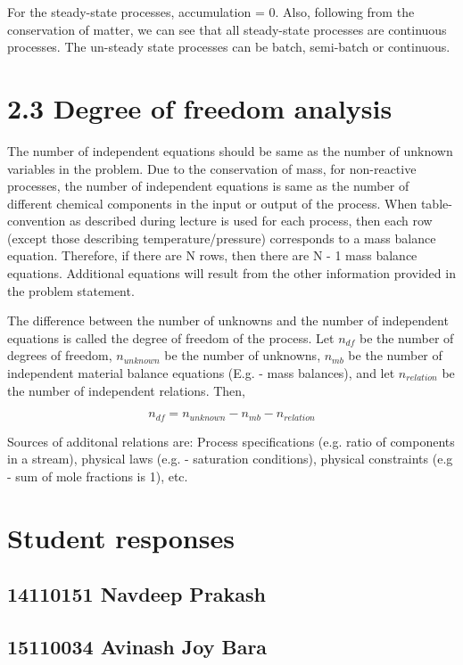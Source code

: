 \documentclass[journal=jpcbfk,manuscript=article]{achemso}
\begin{document}
For the steady-state processes, accumulation = 0. Also, following from the conservation of matter, we can see that all steady-state processes are continuous processes. The un-steady state processes can be batch, semi-batch or continuous.

\section{2.3 Degree of freedom analysis}

The number of independent equations should be same as the number of unknown variables in the problem. Due to the conservation of mass, for non-reactive processes, the number of independent equations is same as the number of different chemical components in the input or output of the process. When table-convention as described during lecture is used for each process, then each row (except those describing temperature/pressure) corresponds to a mass balance equation. Therefore, if there are N rows, then there are N - 1 mass balance equations. Additional equations will result from the other information provided in the problem statement.  

The difference between the number of unknowns and the number of independent equations is called the degree of freedom of the process. Let $n_{df}$ be the number of degrees of freedom, $n_{unknown}$ be the number of unknowns, $n_{mb}$ be the number of independent material balance equations (E.g. - mass balances), and let $n_{relation}$ be the number of independent relations. Then,

\begin{equation}\label{eqn_df}
{n_{df} =  n_{unknown} - n_{mb} - n_{relation} }
\end{equation}

Sources of additonal relations are:  Process specifications  (e.g. ratio of components in a stream), physical laws (e.g. - saturation conditions), physical constraints (e.g - sum of mole fractions is 1), etc.

\section{Student responses}

\subsection {14110151	Navdeep Prakash}

\subsection {15110034	Avinash Joy Bara}
\end{document}
